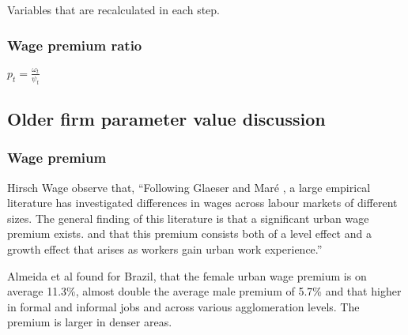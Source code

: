 Variables that are recalculated in each step.


\subsubsection{Wage premium ratio}

$p_t= \frac{\omega_t}{\psi_t}$ 

\subsection{Older firm parameter value discussion}



\subsubsection{Wage premium} \label{section-wage-premium}

Hirsch Wage \cite{hirschUrbanWagePremium2019} observe that, ``Following Glaeser and Maré \cite{glaeserCitiesSkills2001},  a  large  empirical  literature  has  investigated differences in wages across labour markets of different sizes. The general finding of this literature is that a significant urban wage premium exists. and that this premium consists both of a level effect and a growth effect that arises as workers gain urban work experience.'' 

Almeida et al \cite{almeidaUrbanWagePremium2022} found for Brazil, that the female urban wage premium is on average 11.3\%, almost double the average male premium of 5.7\% and that higher in formal and informal jobs and across various agglomeration levels. The premium is larger in denser areas.







